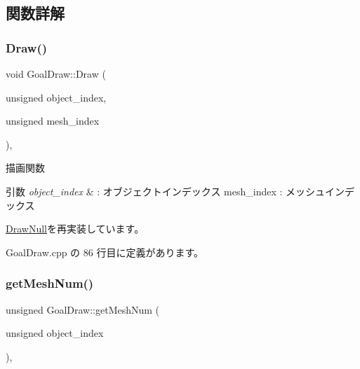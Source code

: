 \subsection{関数詳解}
\mbox{\label{class_goal_draw_a554c826d7a4534ee489dfe18edf7ee0e}} 
\subsubsection{\texorpdfstring{Draw()}{Draw()}}
{\footnotesize\ttfamily void Goal\+Draw\+::\+Draw (\begin{DoxyParamCaption}\item[{unsigned}]{object\+\_\+index,  }\item[{unsigned}]{mesh\+\_\+index }\end{DoxyParamCaption})\hspace{0.3cm}{\ttfamily [override]}, {\ttfamily [virtual]}}



描画関数 


\begin{DoxyParams}{引数}
{\em object\+\_\+index} & \+: オブジェクトインデックス mesh\+\_\+index \+: メッシュインデックス \\
\hline
\end{DoxyParams}


\mbox{\hyperlink{class_draw_null_a72ac0b7dc40b1469582419dcc5b0e114}{Draw\+Null}}を再実装しています。



 Goal\+Draw.\+cpp の 86 行目に定義があります。

\mbox{\label{class_goal_draw_ac80c8da78cda7b15a4ce46f7d7057622}} 
\subsubsection{\texorpdfstring{get\+Mesh\+Num()}{getMeshNum()}}
{\footnotesize\ttfamily unsigned Goal\+Draw\+::get\+Mesh\+Num (\begin{DoxyParamCaption}\item[{unsigned}]{object\+\_\+index }\end{DoxyParamCaption})\hspace{0.3cm}{\ttfamily [override]}, {\ttfamily [virtual]}}




